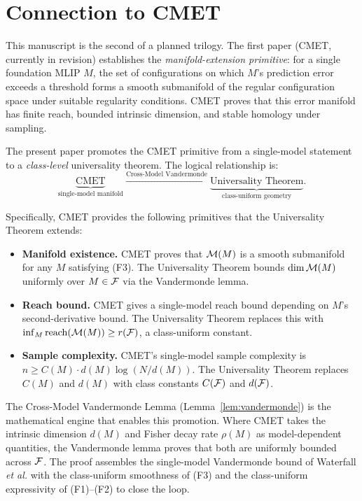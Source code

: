 \section{Connection to CMET}\label{sec:cmet}

This manuscript is the second of a planned trilogy. The first paper (CMET, currently in revision) establishes the \emph{manifold-extension primitive}: for a single foundation MLIP $M$, the set of configurations on which $M$'s prediction error exceeds a threshold forms a smooth submanifold of the regular configuration space under suitable regularity conditions. CMET proves that this error manifold has finite reach, bounded intrinsic dimension, and stable homology under sampling.

The present paper promotes the CMET primitive from a single-model statement to a \emph{class-level} universality theorem. The logical relationship is:
\begin{equation}\label{eq:cmet-universality}
    \underbrace{\text{CMET}}_{\text{single-model manifold}} \xrightarrow{\text{Cross-Model Vandermonde}} \underbrace{\text{Universality Theorem}}_{\text{class-uniform geometry}}.
\end{equation}

Specifically, CMET provides the following primitives that the Universality Theorem extends:
\begin{itemize}
    \item \textbf{Manifold existence.} CMET proves that $\mathcal{M}(M)$ is a smooth submanifold for any $M$ satisfying (F3). The Universality Theorem bounds $\dim \mathcal{M}(M)$ uniformly over $M \in \mathcal{F}$ via the Vandermonde lemma.
    \item \textbf{Reach bound.} CMET gives a single-model reach bound depending on $M$'s second-derivative bound. The Universality Theorem replaces this with $\inf_M \mathrm{reach}(\mathcal{M}(M)) \geq r(\mathcal{F})$, a class-uniform constant.
    \item \textbf{Sample complexity.} CMET's single-model sample complexity is $n \geq C(M) \cdot d(M) \log(N/d(M))$. The Universality Theorem replaces $C(M)$ and $d(M)$ with class constants $C(\mathcal{F})$ and $d(\mathcal{F})$.
\end{itemize}

The Cross-Model Vandermonde Lemma (Lemma~\ref{lem:vandermonde}) is the mathematical engine that enables this promotion. Where CMET takes the intrinsic dimension $d(M)$ and Fisher decay rate $\rho(M)$ as model-dependent quantities, the Vandermonde lemma proves that both are uniformly bounded across $\mathcal{F}$. The proof assembles the single-model Vandermonde bound of Waterfall \emph{et al.}\cite{waterfall2006sloppy} with the class-uniform smoothness of (F3) and the class-uniform expressivity of (F1)--(F2) to close the loop.

